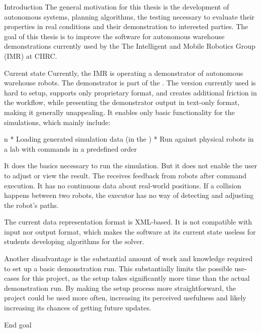 \chap Introduction
The general motivation for this thesis is the development of autonomous systems, planning algorithms, the testing necessary to evaluate their properties in real conditions and their demonstration to interested parties.
\br
\br
The goal of this thesis is to improve the software for autonomous warehouse demonstrations currently used by the The Intelligent and Mobile Robotics Group (IMR) at CIIRC. 

\sec Current state
Currently, the IMR is operating a demonstrator of autonomous warehouse robots. The demonstrator is part of the {\oldRepo}. The version currently used is hard to setup, supports only proprietary format, and creates additional friction in the workflow, while presenting the demonstrator output in text-only format, making it generally unappealing. It enables only basic functionality for the simulations, which mainly include:

\begitems \style n
    * Loading generated simulation data (in the {\oldFormat})
    * Run against physical robots in a lab with commands in a predefined order
\enditems

It does the basics necessary to run the simulation. But it does not enable the user to adjust or view the result. The {\oldRepo} receives feedback from robots after command execution. It has no continuous data about real-world positions. If a collision happens between two robots, the executor has no way of detecting and adjusting the robot's paths.

The current data representation format is XML-based. It is not compatible with {\mapfIR} input nor output format, which makes the software at its current state useless for students developing algorithms for the {\mapfIR} solver. 

Another disadvantage is the substantial amount of work and knowledge required to set up a basic demonstration run. This substantially limits the possible use-cases for this project, as the setup takes significantly more time than the actual demonstration run. By making the setup process more straightforward, the project could be used more often, increasing its perceived usefulness and likely increasing its chances of getting future updates.

\sec End goal

